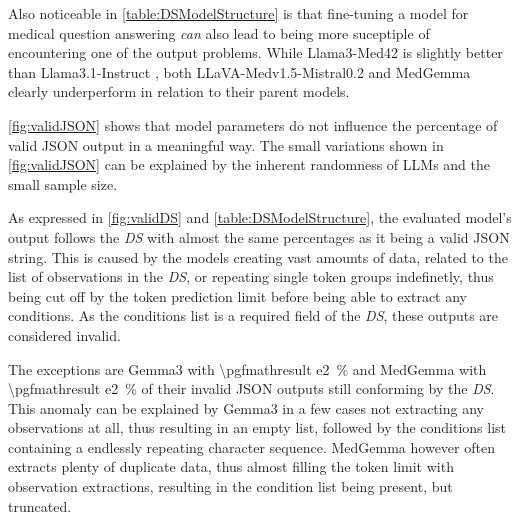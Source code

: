 \documentclass[bs, english]{stthesis}
\newcommand\percentage[2][round-precision = 2]{%
    \SI[round-mode = places,
        scientific-notation = fixed, fixed-exponent = 0,
        output-decimal-marker={.}, #1]{#2e2}{\percent}%
}
\begin{document}
Also noticeable in \cref{table:DSModelStructure} is that fine-tuning a model for medical question answering \textit{can} also lead to being more suceptiple of encountering one of the output problems. While Llama3-Med42 \cite{christopheMed42v2SuiteClinical2024} is slightly better than Llama3.1-Instruct \cite{grattafioriLlama3Herd2024}, both LLaVA-Medv1.5-Mistral0.2 \cite{liLLaVAMedTrainingLarge2023} and MedGemma \cite{sellergrenMedGemmaTechnicalReport2025} clearly underperform in relation to their parent models.

\cref{fig:validJSON} shows that model parameters do not influence the percentage of valid JSON output in a meaningful way. The small variations shown in \cref{fig:validJSON} can be explained by the inherent randomness of LLMs and the small sample size.

As expressed in \cref{fig:validDS} and \cref{table:DSModelStructure}, the evaluated model's output follows the \textit{DS} with almost the same percentages as it being a valid JSON string. This is caused by the models creating vast amounts of data, related to the list of observations in the \textit{DS}, or repeating single token groups indefinetly, thus being cut off by the token prediction limit before being able to extract any conditions. As the conditions list is a required field of the \textit{DS}, these outputs are considered invalid.

\of{\tableAvgModels}
\edef\GvS{\pgfplotsretval}
\of{\tableAvgModels}
\edef\GvJ{\pgfplotsretval}
\pgfmathparse{(\GvS - \GvJ) / (1 - \GvJ)}
\edef\Gval{\pgfmathresult}

\of{\tableAvgModels}
\edef\MGvS{\pgfplotsretval}
\of{\tableAvgModels}
\edef\MGvJ{\pgfplotsretval}
\pgfmathparse{(\MGvS - \MGvJ) / (1 - \MGvJ)}
\edef\MGval{\pgfmathresult}

The exceptions are Gemma3 with \percentage[round-precision=1]{\Gval} and MedGemma with \percentage[round-precision=1]{\MGval} of their invalid JSON outputs still conforming by the \textit{DS}. This anomaly can be explained by Gemma3 in a few cases not extracting any observations at all, thus resulting in an empty list, followed by the conditions list containing a endlessly repeating character sequence. MedGemma however often extracts plenty of duplicate data, thus almost filling the token limit with observation extractions, resulting in the condition list being present, but truncated.
\end{document}
